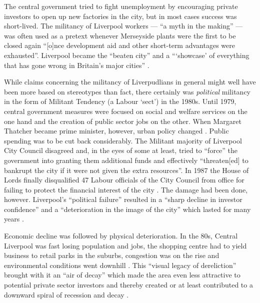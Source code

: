 The central government tried to fight unemployment by encouraging private investors to open up new factories in the city, but in most cases success was short-lived.
The militancy of Liverpool workers --- ``a myth in the making'' --- was often used as a pretext whenever Merseyside plants were the first to be closed again ``[o]nce development aid and other short-term advantages were exhausted''\citep[cf.][52]{belchem2006a}.
Liverpool became the ``beaten city'' and a ```showcase' of everything that has gone wrong in Britain's major cities'' \citep[\emph{Daily Mirror}, 11 October 1982, cited in][52--53]{belchem2006a}.

While claims concerning the militancy of Liverpudlians in general might well have been more based on stereotypes than fact, there certainly was \emph{political} militancy in the form of Militant Tendency (a Labour `sect') in the 1980s.
Until 1979, central government measures were focused on social and welfare services on the one hand and the creation of public sector jobs on the other. When Margaret Thatcher became prime minister, however, urban policy changed \citep[cf.][19]{juddparkinson1990a}.
Public spending was to be cut back considerably.
The Militant majority of Liverpool City Council disagreed and, in the eyes of some at least, tried to \enquote{force} the government into granting them additional funds and effectively ``threaten[ed] to bankrupt the city if it were not given the extra resources''.
In 1987 the House of Lords finally disqualified 47 Labour officials of the City Council from office for failing to protect the financial interest of the city \citep[cf.][249--250]{parkinson1990}.
The damage had been done, however.
Liverpool's ``political failure'' \citep[241]{parkinson1990} resulted in a ``sharp decline in investor confidence'' and a ``deterioration in the image of the city'' which lasted for many years \citep[172]{couch2003a}.

Economic decline was followed by physical deterioration.
In the 80s, Central Liverpool was fast losing population and jobs, the shopping centre had to yield business to retail parks in the suburbs, congestion was on the rise and environmental conditions went downhill \citep[cf.][38]{couch2003}.
This ``visual legacy of dereliction'' brought with it an ``air of decay'' which made the area even less attractive to potential private sector investors and thereby created or at least contributed to a downward spiral of recession and decay \citep[21]{fraser2003}.

